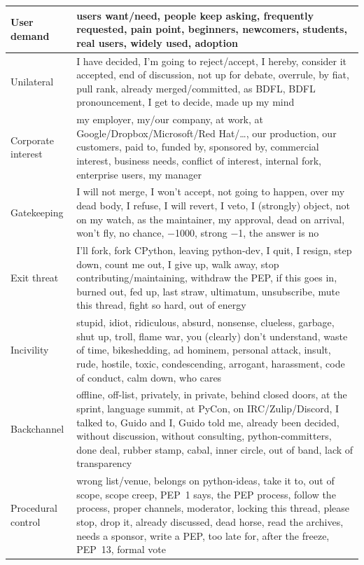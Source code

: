 \begin{table}[t]
\begin{tabular}{p{}p{}}
User demand & users want/need, people keep asking, frequently requested, pain point, beginners, newcomers, students, real users, widely used, adoption \\
\midrule
Unilateral & I have decided, I'm going to reject/accept, I hereby, consider it accepted, end of discussion, not up for debate, overrule, by fiat, pull rank, already merged/committed, as BDFL, BDFL pronouncement, I get to decide, made up my mind \\
Corporate interest & my employer, my/our company, at work, at Google/Dropbox/Microsoft/Red Hat/\ldots, our production, our customers, paid to, funded by, sponsored by, commercial interest, business needs, conflict of interest, internal fork, enterprise users, my manager \\
Gatekeeping & I will not merge, I won't accept, not going to happen, over my dead body, I refuse, I will revert, I veto, I (strongly) object, not on my watch, as the maintainer, my approval, dead on arrival, won't fly, no chance, $-$1000, strong $-$1, the answer is no \\
Exit threat & I'll fork, fork CPython, leaving python-dev, I quit, I resign, step down, count me out, I give up, walk away, stop contributing/maintaining, withdraw the PEP, if this goes in, burned out, fed up, last straw, ultimatum, unsubscribe, mute this thread, fight so hard, out of energy \\
Incivility & stupid, idiot, ridiculous, absurd, nonsense, clueless, garbage, shut up, troll, flame war, you (clearly) don't understand, waste of time, bikeshedding, ad hominem, personal attack, insult, rude, hostile, toxic, condescending, arrogant, harassment, code of conduct, calm down, who cares \\
Backchannel & offline, off-list, privately, in private, behind closed doors, at the sprint, language summit, at PyCon, on IRC/Zulip/Discord, I talked to, Guido and I, Guido told me, already been decided, without discussion, without consulting, python-committers, done deal, rubber stamp, cabal, inner circle, out of band, lack of transparency \\
Procedural control & wrong list/venue, belongs on python-ideas, take it to, out of scope, scope creep, PEP~1 says, the PEP process, follow the process, proper channels, moderator, locking this thread, please stop, drop it, already discussed, dead horse, read the archives, needs a sponsor, write a PEP, too late for, after the freeze, PEP~13, formal vote \\
\bottomrule
\end{tabular}
\end{table}

